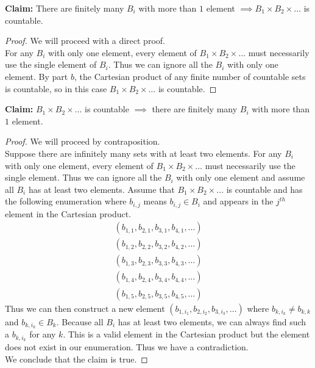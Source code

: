 \documentclass[11pt]{article}
\begin{document}
\begin{Parts}
\begin{Answer}
        \textbf{Claim:} There are finitely many $B_i$ with more than $1$ element $\implies B_1 \times B_2 \times \ldots$ is countable.
        \begin{proof}
            We will proceed with a direct proof. \\
            For any $B_i$ with only one element, every element of $B_1 \times B_2 \times \ldots$ must necessarily use the single 
            element of $B_i$. Thus we can ignore all the $B_i$ with only one element. By part $b$, the Cartesian product of any finite 
            number of countable sets is countable, so in this case $B_1 \times B_2 \times \ldots$ is countable. 
        \end{proof}
        \textbf{Claim:} $ B_1 \times B_2 \times \ldots$ is countable $\implies$ there are finitely many $B_i$ with more than $1$ element. 
        \begin{proof}
            We will proceed by contraposition. \\
            Suppose there are infinitely many sets with at least two elements. For any $B_i$ with only one element, every element of 
            $B_1 \times B_2 \times \ldots$ must necessarily use the single element. Thus we can ignore all the $B_i$ with only one element and 
            assume all $B_i$ has at least two elements. Assume that $B_1 \times B_2 \times \ldots$ is countable and has the following 
            enumeration where $b_{i,j}$ means $b_{i,j} \in B_i$ and appears in the $j^{th}$ element in the Cartesian product. 
            \begin{align*}
                (b_{1,1}, b_{2,1}, b_{3,1}, b_{4,1}, \ldots) \\
                (b_{1,2}, b_{2,2}, b_{3,2}, b_{4,2}, \ldots) \\
                (b_{1,3}, b_{2,3}, b_{3,3}, b_{4,3}, \ldots) \\
                (b_{1,4}, b_{2,4}, b_{3,4}, b_{4,4}, \ldots) \\
                (b_{1,5}, b_{2,5}, b_{3,5}, b_{4,5}, \ldots)
            \end{align*}
            Thus we can then construct a new element $(b_{1,i_1}, b_{2,i_2}, b_{3,i_3}, \ldots)$ where $b_{k,i_k} \neq b_{k,k}$ and 
            $b_{k,i_k} \in B_k$. Because all $B_i$ has at least two elements, we can always find such a $b_{k,i_k}$ for any $k$. This 
            is a valid element in the Cartesian product but the element does not exist in our enumeration. Thus we have a contradiction. \\
            We conclude that the claim is true. 
        \end{proof}
    \end{Answer}
    
\end{Parts}
\end{document}
